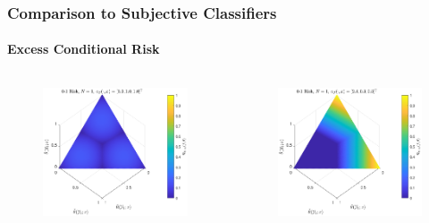 \documentclass[aspectratio=169]{beamer}
\begin{document}
\begin{frame}
\frametitle{Comparison to Subjective Classifiers}
\framesubtitle{Excess Conditional Risk}

\begin{columns}[c]

\begin{column}{.5\linewidth}

\begin{figure}
\centering
\includegraphics[width=1\linewidth]{Risk_cond_ex_01_Dir_theta__uni.pdf}
\label{fig:Risk_cond_ex_01_Dir_theta__uni}
\end{figure}

\end{column}

\begin{column}{.5\linewidth}

\begin{figure}
\centering
\includegraphics[width=1\linewidth]{Risk_cond_ex_01_Dir_theta__subj.pdf}
\label{fig:Risk_cond_ex_01_Dir_theta__subj}
\end{figure}


\end{column}
\end{columns}
\end{frame}
\end{document}
